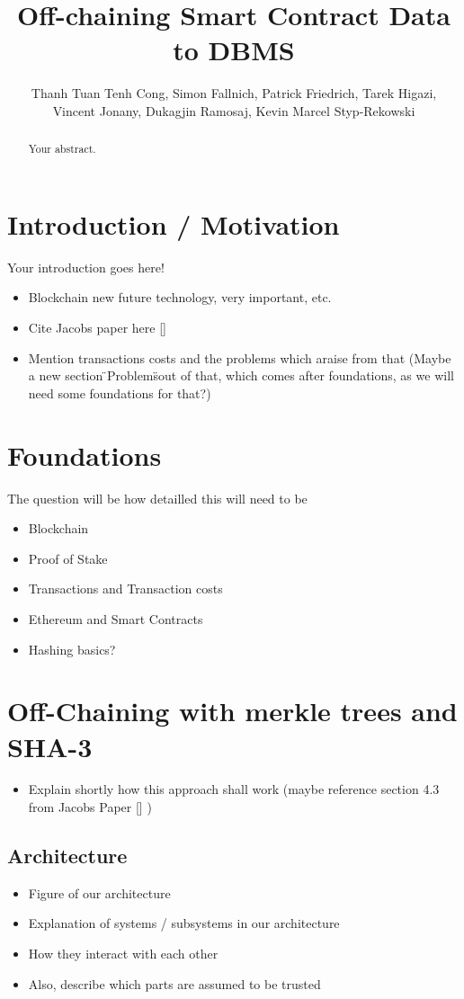 \documentclass[a4paper]{article}
\title{Off-chaining Smart Contract Data to DBMS}
\author{Thanh Tuan Tenh Cong, 
Simon Fallnich,
Patrick Friedrich,
Tarek Higazi,\\
Vincent Jonany,
Dukagjin Ramosaj,
Kevin Marcel Styp-Rekowski}
\begin{document}
\maketitle

\begin{abstract}
Your abstract.
\end{abstract}
\newpage
\tableofcontents
\newpage

\section{Introduction / Motivation}

Your introduction goes here! 
\begin{itemize}
\item Blockchain new future technology, very important, etc.
\item Cite Jacobs paper here [\cite{Eberhardt2017}]
\item Mention transactions costs and the problems which araise from that (Maybe a new section \"{}Problems\"{}out of that, which comes after foundations, as we will need some foundations for that?)
\end{itemize}


\section{Foundations}
The question will be how detailled this will need to be
\begin{itemize}
\item Blockchain
\item Proof of Stake
\item Transactions and Transaction costs
\item Ethereum and Smart Contracts
\item Hashing basics?
\end{itemize}


\section{Off-Chaining with merkle trees and SHA-3}
\begin{itemize}
\item Explain shortly how this approach shall work (maybe reference section 4.3 from Jacobs Paper [\cite{Eberhardt2017}] )
\end{itemize}

\subsection{Architecture}
\begin{itemize}
\item Figure of our architecture
\item Explanation of systems / subsystems in our architecture
\item How they interact with each other
\item Also, describe which parts are assumed to be trusted
\end{itemize}
\end{document}

